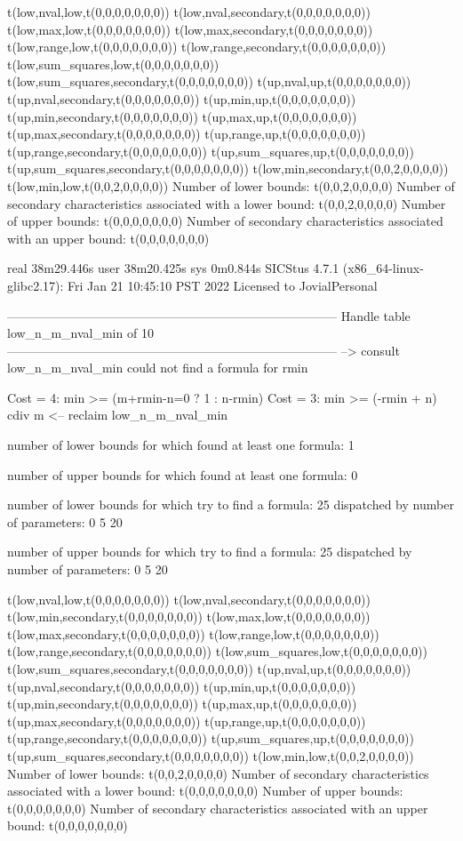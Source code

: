 t(low,nval,low,t(0,0,0,0,0,0,0))
t(low,nval,secondary,t(0,0,0,0,0,0,0))
t(low,max,low,t(0,0,0,0,0,0,0))
t(low,max,secondary,t(0,0,0,0,0,0,0))
t(low,range,low,t(0,0,0,0,0,0,0))
t(low,range,secondary,t(0,0,0,0,0,0,0))
t(low,sum_squares,low,t(0,0,0,0,0,0,0))
t(low,sum_squares,secondary,t(0,0,0,0,0,0,0))
t(up,nval,up,t(0,0,0,0,0,0,0))
t(up,nval,secondary,t(0,0,0,0,0,0,0))
t(up,min,up,t(0,0,0,0,0,0,0))
t(up,min,secondary,t(0,0,0,0,0,0,0))
t(up,max,up,t(0,0,0,0,0,0,0))
t(up,max,secondary,t(0,0,0,0,0,0,0))
t(up,range,up,t(0,0,0,0,0,0,0))
t(up,range,secondary,t(0,0,0,0,0,0,0))
t(up,sum_squares,up,t(0,0,0,0,0,0,0))
t(up,sum_squares,secondary,t(0,0,0,0,0,0,0))
t(low,min,secondary,t(0,0,2,0,0,0,0))
t(low,min,low,t(0,0,2,0,0,0,0))
Number of lower bounds:                                             t(0,0,2,0,0,0,0)
Number of secondary characteristics associated with a lower bound:  t(0,0,2,0,0,0,0)
Number of upper bounds:                                             t(0,0,0,0,0,0,0)
Number of secondary characteristics associated with an upper bound: t(0,0,0,0,0,0,0)

real	38m29.446s
user	38m20.425s
sys	0m0.844s
SICStus 4.7.1 (x86_64-linux-glibc2.17): Fri Jan 21 10:45:10 PST 2022
Licensed to JovialPersonal


--------------------------------------------------------------------------------
Handle table low_n_m_nval_min of 10
--------------------------------------------------------------------------------
--> consult low_n_m_nval_min
could not find a formula for rmin

Cost =  4:  min >= (m+rmin-n=0 ? 1 : n-rmin)
Cost =  3:  min >= (-rmin + n) cdiv m
<-- reclaim low_n_m_nval_min

number of lower bounds for which found at least one formula: 1

number of upper bounds for which found at least one formula: 0

number of lower bounds for which try to find a formula: 25
dispatched by number of parameters: 0  5  20

number of upper bounds for which try to find a formula: 25
dispatched by number of parameters: 0  5  20

t(low,nval,low,t(0,0,0,0,0,0,0))
t(low,nval,secondary,t(0,0,0,0,0,0,0))
t(low,min,secondary,t(0,0,0,0,0,0,0))
t(low,max,low,t(0,0,0,0,0,0,0))
t(low,max,secondary,t(0,0,0,0,0,0,0))
t(low,range,low,t(0,0,0,0,0,0,0))
t(low,range,secondary,t(0,0,0,0,0,0,0))
t(low,sum_squares,low,t(0,0,0,0,0,0,0))
t(low,sum_squares,secondary,t(0,0,0,0,0,0,0))
t(up,nval,up,t(0,0,0,0,0,0,0))
t(up,nval,secondary,t(0,0,0,0,0,0,0))
t(up,min,up,t(0,0,0,0,0,0,0))
t(up,min,secondary,t(0,0,0,0,0,0,0))
t(up,max,up,t(0,0,0,0,0,0,0))
t(up,max,secondary,t(0,0,0,0,0,0,0))
t(up,range,up,t(0,0,0,0,0,0,0))
t(up,range,secondary,t(0,0,0,0,0,0,0))
t(up,sum_squares,up,t(0,0,0,0,0,0,0))
t(up,sum_squares,secondary,t(0,0,0,0,0,0,0))
t(low,min,low,t(0,0,2,0,0,0,0))
Number of lower bounds:                                             t(0,0,2,0,0,0,0)
Number of secondary characteristics associated with a lower bound:  t(0,0,0,0,0,0,0)
Number of upper bounds:                                             t(0,0,0,0,0,0,0)
Number of secondary characteristics associated with an upper bound: t(0,0,0,0,0,0,0)


